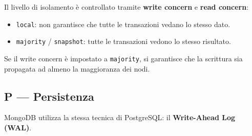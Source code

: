 Il livello di isolamento è controllato tramite \textbf{write concern} e \textbf{read concern}:

\begin{itemize}
	\item \texttt{local}: non garantisce che tutte le transazioni vedano lo stesso dato.
	\item \texttt{majority} / \texttt{snapshot}: tutte le transazioni vedono lo stesso risultato.
\end{itemize}

Se il write concern è impostato a \texttt{majority}, si garantisce che la scrittura sia propagata ad almeno la maggioranza dei nodi.

\subsection*{P — Persistenza}

MongoDB utilizza la stessa tecnica di PostgreSQL: il \textbf{Write-Ahead Log (WAL)}.
